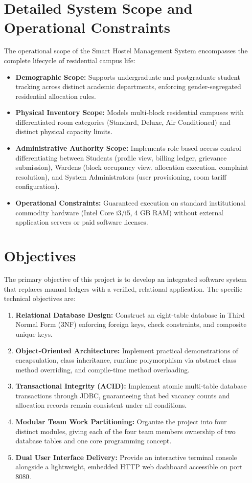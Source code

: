 \documentclass[12pt,a4paper]{report}
\begin{document}
\section{Detailed System Scope and Operational Constraints}
The operational scope of the Smart Hostel Management System encompasses the complete lifecycle of residential campus life:
\begin{itemize}
\item \textbf{Demographic Scope:} Supports undergraduate and postgraduate student tracking across distinct academic departments, enforcing gender-segregated residential allocation rules.
\item \textbf{Physical Inventory Scope:} Models multi-block residential campuses with differentiated room categories (Standard, Deluxe, Air Conditioned) and distinct physical capacity limits.
\item \textbf{Administrative Authority Scope:} Implements role-based access control differentiating between Students (profile view, billing ledger, grievance submission), Wardens (block occupancy view, allocation execution, complaint resolution), and System Administrators (user provisioning, room tariff configuration).
\item \textbf{Operational Constraints:} Guaranteed execution on standard institutional commodity hardware (Intel Core i3/i5, 4 GB RAM) without external application servers or paid software licenses.
\end{itemize}

\section{Objectives}
The primary objective of this project is to develop an integrated software system that replaces manual ledgers with a verified, relational application. The specific technical objectives are:
\begin{enumerate}
\item \textbf{Relational Database Design:} Construct an eight-table database in Third Normal Form (3NF) enforcing foreign keys, check constraints, and composite unique keys.
\item \textbf{Object-Oriented Architecture:} Implement practical demonstrations of encapsulation, class inheritance, runtime polymorphism via abstract class method overriding, and compile-time method overloading.
\item \textbf{Transactional Integrity (ACID):} Implement atomic multi-table database transactions through JDBC, guaranteeing that bed vacancy counts and allocation records remain consistent under all conditions.
\item \textbf{Modular Team Work Partitioning:} Organize the project into four distinct modules, giving each of the four team members ownership of two database tables and one core programming concept.
\item \textbf{Dual User Interface Delivery:} Provide an interactive terminal console alongside a lightweight, embedded HTTP web dashboard accessible on port 8080.
\end{enumerate}
\end{document}
